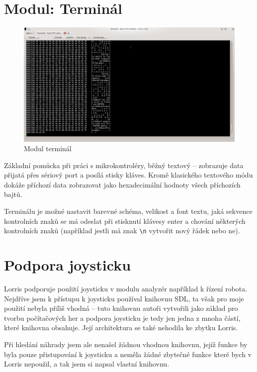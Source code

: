 \documentclass[12pt, a4paper, oneside]{article}
\begin{document}
\section{Modul: Terminál}
\begin{figure}[H]
\begin{center}
\includegraphics[width=\textwidth]{img/terminal.png}
\caption{Modul terminál}
\label{Terminal}
\end{center}
\end{figure}
Základní pomůcka při práci s mikrokontroléry, běžný textový -- zobrazuje data přijatá přes sériový port a posílá stisky kláves. Kromě klasického textového módu dokáže příchozí data zobrazovat jako hexadecimální hodnoty všech příchozích bajtů.

Terminálu je možné nastavit barevné schéma, velikost a font textu, jaká sekvence kontrolních znaků se má odeslat při stisknutí klávesy enter a chování některých kontrolních znaků (například jestli má znak \verb|\n| vytvořit nový řádek nebo ne).

\newpage
\section{Podpora joysticku}
Lorris podporuje použití joysticku v modulu analyzér například k řízení robota. Nejdříve jsem k přístupu k joysticku používal knihovnu SDL\cite{sdl}, ta však pro moje použití nebyla příliš vhodná -- tuto knihovnu autoři vytvořili jako základ pro tvorbu počítačových her a podpora joysticku je tedy jen jedna z mnoha částí, které knihovna obsahuje. Její architektura se také nehodila ke zbytku Lorris.

Při hledání náhrady jsem ale nenašel žádnou vhodnou knihovnu, jejíž funkce by byla pouze přistupování k joysticku a neměla žádné zbytečné funkce které bych v Lorris nepoužil, a tak jsem si napsal vlastní knihovnu.
\end{document}
